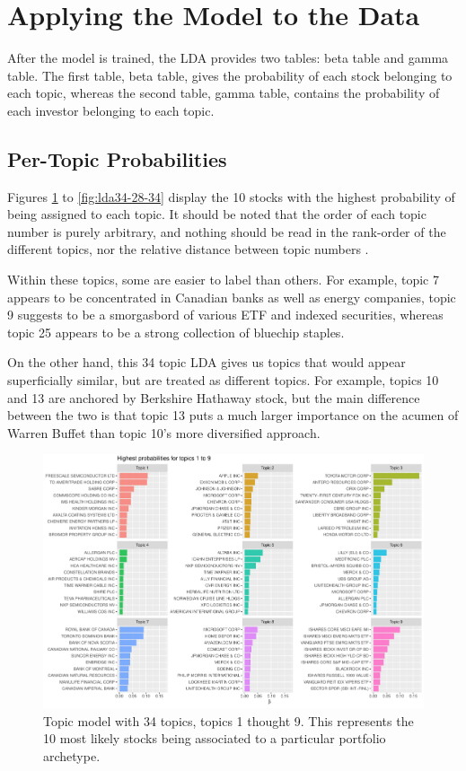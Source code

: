 \section{Applying the Model to the Data}

After the model is trained, the LDA provides two tables: beta table and gamma table. The first table, beta table, gives the probability of each stock belonging to each topic, whereas the second table, gamma table, contains the probability of each investor belonging to each topic. 


\subsection{Per-Topic Probabilities}

Figures \ref{fig:lda34-1-9} to \ref{fig:lda34-28-34} display the 10 stocks with the highest probability of being assigned to each topic.  It should be noted that the order of each topic number is purely arbitrary, and nothing should be read in the rank-order of the different topics, nor the relative distance between topic numbers \citep{Silge2018}.  

Within these topics, some are easier to label than others.  For example, topic 7 appears to be concentrated in Canadian banks as well as energy companies, topic 9 suggests to be a smorgasbord of various ETF and indexed securities, whereas topic 25 appears to be a strong collection of bluechip staples.  

On the other hand, this 34 topic LDA gives us topics that would appear superficially similar, but are treated as different topics.  For example, topics 10 and 13 are anchored by Berkshire Hathaway stock, but the main difference between the two is that topic 13 puts a much larger importance on the acumen of Warren Buffet than topic 10's more diversified approach.  

\begin{figure}
	\centering
	\includegraphics[width=\linewidth]{Figures/ChapterV/LDA34_1-9}
	\caption[Topic Model with 34 Topics, Topics 1 thought 9]{Topic model with 34 topics, topics 1 thought 9. This represents the 10 most likely stocks being associated to a particular portfolio archetype.}
	\label{fig:lda34-1-9}
\end{figure}

